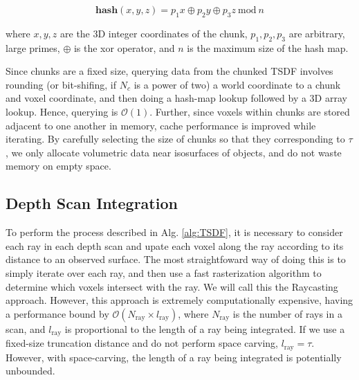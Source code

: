 \documentclass[10pt,twocolumn,letterpaper]{article}
\begin{document}
\begin{equation}
\textbf{hash}(x, y, z) = p_1 x\oplus p_2 y \oplus p_3 z
~\text{mod}~n
\end{equation}

\noindent where $x, y, z$ are the 3D integer coordinates of the chunk, $p_1,
p_2, p_3$ are arbitrary, large primes, $\oplus$ is the xor operator, and $n$ is
the maximum size of the hash map.

Since chunks are a fixed size, querying data from the chunked TSDF involves
rounding (or bit-shifing, if $N_c$ is a power of two) a world coordinate to a
chunk and voxel coordinate, and then doing a hash-map lookup followed by a 3D
array lookup. Hence, querying is $\mathcal{O}(1)$. Further, since voxels within
chunks are stored adjacent to one another in memory, cache performance is
improved while iterating. By carefully selecting the size of chunks so that they
corresponding to $\tau$, we only allocate volumetric data near isosurfaces of
objects, and do not waste memory on empty space.

\subsection{Depth Scan Integration}
\label{section:scan_integration}
To perform the process described in Alg. \ref{alg:TSDF}, it is necessary
to consider each ray in each depth scan and upate each voxel
along the ray according to its distance to an observed surface. The most
straightfoward way of doing this is to simply iterate over each ray, and then
use a fast rasterization algorithm \cite{RayTracing} to determine which voxels
intersect with the ray. We will call this the Raycasting approach.
However, this approach is extremely computationally expensive, having a
performance bound by $\mathcal{O}(N_{\text{ray}} \times l_{\text{ray}})$, where
$N_{\text{ray}}$ is the number of rays in a scan, and $l_{\text{ray}}$  is 
proportional to the length of a ray being integrated. If we use a fixed-size
truncation distance and do not perform space carving, $l_{\text{ray}} = \tau$.
However, with space-carving, the length of a ray being integrated is
potentially unbounded.
\end{document}
